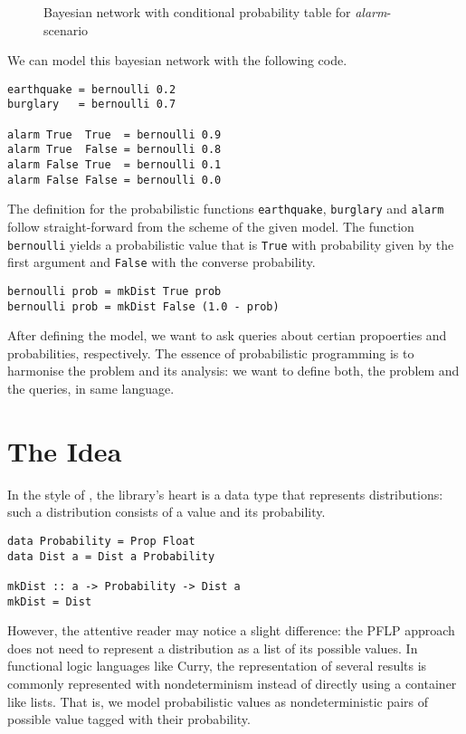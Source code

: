 \documentclass[
12pt, %
a4paper, %
oneside, %
]{llncs}
\newcommand{\code}[1]{{\texttt{#1}}}
\begin{document}
\begin{figure}
\caption{Bayesian network with conditional probability table for \emph{alarm}-scenario}
\end{figure}

We can model this bayesian network with the following code. %

\begin{verbatim}
earthquake = bernoulli 0.2
burglary   = bernoulli 0.7

alarm True  True  = bernoulli 0.9
alarm True  False = bernoulli 0.8
alarm False True  = bernoulli 0.1
alarm False False = bernoulli 0.0
\end{verbatim}

The definition for the probabilistic functions \code{earthquake},
\code{burglary} and \code{alarm} follow straight-forward from the
scheme of the given model. %
The function \code{bernoulli} yields a probabilistic value that is
\code{True} with probability given by the first argument and
\code{False} with the converse probability. %

\begin{verbatim}
bernoulli prob = mkDist True prob
bernoulli prob = mkDist False (1.0 - prob)
\end{verbatim}

After defining the model, we want to ask queries about certian
propoerties and probabilities, respectively. %
The essence of probabilistic programming is to harmonise the problem
and its analysis: we want to define both, the problem and the queries,
in same language. %

\section{The Idea}

In the style of \cite{pfp}, the library's heart is a data type that
represents distributions: such a distribution consists of a value and
its probability. %

\begin{verbatim}
data Probability = Prop Float
data Dist a = Dist a Probability

mkDist :: a -> Probability -> Dist a
mkDist = Dist
\end{verbatim}

However, the attentive reader may notice a slight difference: the PFLP
approach does not need to represent a distribution as a list of its
possible values. %
In functional logic languages like Curry, the representation of
several results is commonly represented with nondeterminism instead of
directly using a container like lists. %
That is, we model probabilistic values as nondeterministic pairs of
possible value tagged with their probability. %
\end{document}
